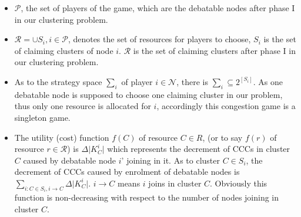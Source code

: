 \documentclass[journal,comsoc]{IEEEtran}
\theoremstyle{mytheoremstyle}
\theoremstyle{mytheoremstyle}
\theoremstyle{mytheoremstyle}
\begin{document}

\begin{itemize}
	\item $\mathcal{P}$, the set of players of the game, which are the debatable nodes after phase I in our clustering problem.
	\item $\mathcal{R} = \cup S_i, i\in \mathcal{P}$, denotes the set of resources for players to choose, $S_i$ is the set of claiming clusters of node $i$. $\mathcal{R}$ is the set of claiming clusters after phase I in our clustering problem.
	\item As to the strategy space $\sum_i$ of player $i\in \mathcal{N}$, there is $\sum_i \subseteq 2^{\left[S_i\right]}$. As one debatable node is supposed to choose one claiming cluster in our problem, thus only one resource is allocated for $i$, accordingly this congestion game is a singleton game.
	
	
	\item %
	The utility (cost) function $f(C)$ of resource $C\in R$, (or to say $f(r)$ of resource $r \in \mathcal{R}$) is $\Delta\vert K^i_C \vert$ which represents the decrement of CCCs in cluster $C$ caused by debatable node $i$' joining in it.
	As to cluster $C\in S_i$, the decrement of CCCs caused by enrolment of debatable nodes is $\sum_{i:C\in S_i, i\rightarrow C} \Delta\vert K^i_C \vert$. 
$i\rightarrow C$ means $i$ joins in cluster $C$.
Obviously this function is non-decreasing with respect to the number of nodes joining in cluster $C$.
	

\end{itemize}
\end{document}
